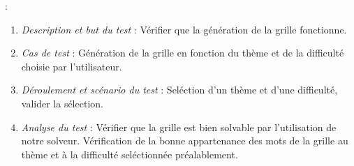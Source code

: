 \documentclass [ 11 pt ] {article}
\begin{document}
 :
        \begin{tcolorbox}[colback=positifC]
            \begin{enumerate}
                \item \textit{Description et but du test }: Vérifier que la génération de la grille fonctionne.
 
                
                \item \textit{Cas de test }: Génération de la grille en fonction du thème et de la difficulté choisie par l'utilisateur.
                
                \item \textit{Déroulement et scénario du test }: Seléction d'un thème et d'une difficulté, valider la sélection.
                
                \item \textit{Analyse du test }: Vérifier que la grille est bien solvable par l'utilisation de notre solveur. Vérification de la bonne appartenance des mots de la grille au thème et à la difficulté seléctionnée préalablement. 
            \end{enumerate}
        \end{tcolorbox}
\end{document}
